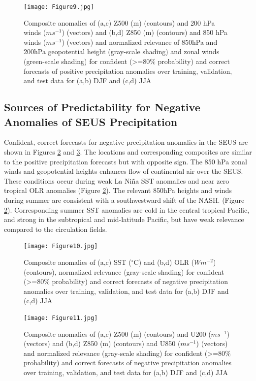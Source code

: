 \documentclass{ametsocV6.1}
\begin{document}
\begin{figure}[t]
  \noindent\texttt{[image: Figure9.jpg]}
  \caption{Composite anomalies of (a,c) Z500 (m) (contours) and 200 hPa winds ($ms^{-1}$) (vectors) and (b,d) Z850 (m) (contours) and 850 hPa winds ($ms^{-1}$) (vectors) and normalized relevance of 850hPa and 200hPa geopotential height (gray-scale shading) and zonal winds (green-scale shading) for confident (>=80\% probability) and correct forecasts of positive precipitation anomalies over training, validation, and test data for (a,b) DJF and (c,d) JJA}\label{f9}
\end{figure}

\subsection{Sources of Predictability for Negative Anomalies of SEUS Precipitation}
\label{sec:resultsneg}

Confident, correct forecasts for negative precipitation anomalies in the SEUS are shown in Figures \ref{f10} and \ref{f11}. The locations and corresponding composites are similar to the positive precipitation forecasts but with opposite sign. The 850 hPa zonal winds and geopotential heights enhances flow of continental air over the SEUS.  These conditions occur during weak La Ni\~{n}a SST anomalies and near zero tropical OLR anomalies (Figure \ref{f10}). The relevant 850hPa heights and winds during summer are consistent with a southwestward shift of the NASH. (Figure \ref{f10}). Corresponding summer SST anomalies are cold in the central tropical Pacific, and strong in the subtropical and mid-latitude Pacific, but have weak relevance compared to the circulation fields. 

\begin{figure}[t]
  \noindent\texttt{[image: Figure10.jpg]}
  \caption{Composite anomalies of (a,c) SST ($^\circ$C) and (b,d) OLR ($Wm^{-2}$) (contours), normalized relevance (gray-scale shading) for confident (>=80\% probability) and correct forecasts of negative precipitation anomalies over training, validation, and test data for (a,b) DJF and (c,d) JJA}\label{f10}
\end{figure}

\begin{figure}[t]
  \noindent\texttt{[image: Figure11.jpg]}
  \caption{Composite anomalies of (a,c) Z500 (m) (contours) and U200 ($ms^{-1}$) (vectors) and (b,d) Z850 (m) (contours) and U850 ($ms^{-1}$) (vectors) and normalized relevance (gray-scale shading) for confident (>=80\% probability) and correct forecasts of negative precipitation anomalies over training, validation, and test data for (a,b) DJF and (c,d) JJA}\label{f11}
\end{figure}
\end{document}
